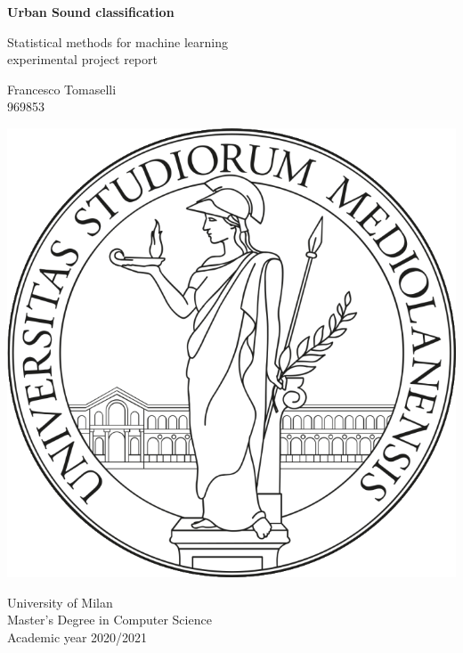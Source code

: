 \begin{titlepage}
    \begin{center}
        \vspace*{2cm}

        \Large
        \textbf{Urban Sound classification}

        \vspace{0.5cm}
        \large
        Statistical methods for machine learning\\ experimental 
        project report
        \vspace{1.5cm}
        
        Francesco Tomaselli\\
        \small
        969853
        \vspace{.5cm}

        \vfill     
        \includegraphics[width=.3\textwidth]{images/logo}
        \vspace*{1cm}

        \normalsize             
        University of Milan\\
        Master's Degree in Computer Science\\
        Academic year 2020/2021
             
    \end{center}
 \end{titlepage}